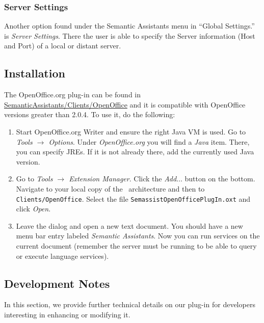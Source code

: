 \subsubsection{Server Settings}
Another option found under the Semantic Assistants menu in ``Global
Settings.'' is \emph{Server Settings}.  There the user is able to specify the
Server information (Host and Port) of a local or distant server.

\subsection{Installation}
\label{subsec:oo-inst}
The OpenOffice.org plug-in can be found in
\url{SemanticAssistants/Clients/OpenOffice} and it is compatible with 
OpenOffice versions greater than 2.0.4. To use it, do the following:

\begin{enumerate}

  \item Start OpenOffice.org Writer and ensure the right Java VM is
  used. Go to \emph{Tools $\rightarrow$ Options}. Under
  \emph{OpenOffice.org} you will find a \emph{Java} item. There, you
  can specify JREs. If it is not already there, add the currently used
  Java version.
  
  \item Go to \emph{Tools $\rightarrow$ Extension Manager}. Click the
    \emph{Add$\ldots$} button on the bottom. Navigate to your local
    copy of the \sa\ architecture and then to
    \texttt{Clients/OpenOffice}. Select the file
    \texttt{SemassistOpenOfficePlugIn.oxt} and click \emph{Open}.

  \item Leave the dialog and open a new text document. You should have
    a new menu bar entry labeled \emph{Semantic Assistants}. Now you
    can run services on the current document (remember the server must
    be running to be able to query or execute language services).
\end{enumerate}


\subsection{Development Notes}
\label{sec:oo-spec}
In this section, we provide further technical details on our plug-in
for developers interesting in enhancing or modifying it.

